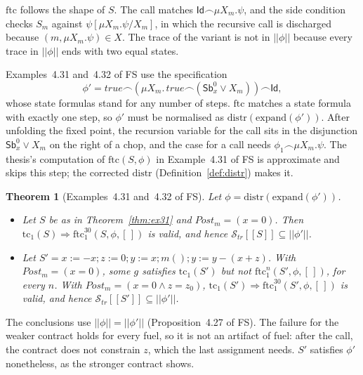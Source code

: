 \documentclass[11pt]{article}
\newcommand{\sem}[1]{[\![ #1 ]\!]}
\newcommand{\fsem}[1]{|\!|#1|\!|}
\newcommand{\Str}{{\mathcal{S}_{\mathit{tr}}}}
\newcommand{\chop}{\smallfrown}
\newcommand{\Id}{\mathsf{Id}}
\newcommand{\Sb}[2]{\mathsf{Sb}^{#1}_{#2}}
\newcommand{\call}[1]{#1()}
\newcommand{\Post}{\mathit{Post}}
\newcommand{\tc}{\mathrm{tc}}
\newcommand{\ftc}{\mathrm{ftc}}
\newcommand{\distr}{\mathrm{distr}}
\newcommand{\Th}[1]{#1 of FS}
\theoremstyle{plain}
\newtheorem{theorem}{Theorem}[section]
\theoremstyle{definition}
\theoremstyle{remark}
\begin{document}
$\ftc$ follows the shape of $S$. The call matches $\Id\chop\mu X_m.\psi$,
and the side condition checks $S_m$ against $\psi[\mu X_m.\psi/X_m]$, in
which the recursive call is discharged because $(m, \mu X_m.\psi) \in X$. The
trace of the variant is not in $\fsem{\phi}$ because every trace in
$\fsem{\phi}$ ends with two equal states.

\Th{Examples~4.31 and~4.32} use the specification
\[
  \phi' = \mathit{true}\chop(\mu X_m.\,\mathit{true}\chop(\Sb{0}{x} \lor
  X_m))\chop\Id,
\]
whose state formulas stand for any number of steps. $\ftc$ matches a state
formula with exactly one step, so $\phi'$ must be normalised as
$\distr(\mathrm{expand}(\phi'))$. After unfolding the fixed point, the
recursion variable for the call sits in the disjunction $\Sb{0}{x} \lor
X_m$ on the right of a chop, and the case for a call needs
$\phi_1\chop\mu X_m.\psi$. The thesis's computation of $\ftc(S, \phi)$ in
\Th{Example~4.31} is approximate and skips this step; the corrected
$\distr$ (Definition~\ref{def:distr}) makes it.

\begin{theorem}[\Th{Examples~4.31 and~4.32}]\label{thm:ex431}
  Let $\phi = \distr(\mathrm{expand}(\phi'))$.
  \begin{itemize}
  \item Let $S$ be as in Theorem~\ref{thm:ex31} and $\Post_m = (x = 0)$.
    Then $\tc_1(S) \Rightarrow \ftc^{30}_1(S, \phi, [\,])$ is valid, and
    hence $\Str\sem{S} \subseteq \fsem{\phi'}$.
  \item Let $S' = x := -x; z := 0; y := x; \call{m}; y := y - (x + z)$.
    With $\Post_m = (x = 0)$, some $g$ satisfies $\tc_1(S')$ but not
    $\ftc^n_1(S', \phi, [\,])$, for every $n$. With $\Post_m = (x = 0
    \land z = z_0)$, $\tc_1(S') \Rightarrow \ftc^{30}_1(S', \phi, [\,])$ is
    valid, and hence $\Str\sem{S'} \subseteq \fsem{\phi'}$.
  \end{itemize}
\end{theorem}

The conclusions use $\fsem{\phi} = \fsem{\phi'}$
(\Th{Proposition~4.27}). The failure for the weaker contract holds for
every fuel, so it is not an artifact of fuel: after the call, the
contract does not constrain $z$, which the last assignment needs. $S'$
satisfies $\phi'$ nonetheless, as the stronger contract shows.
\end{document}
